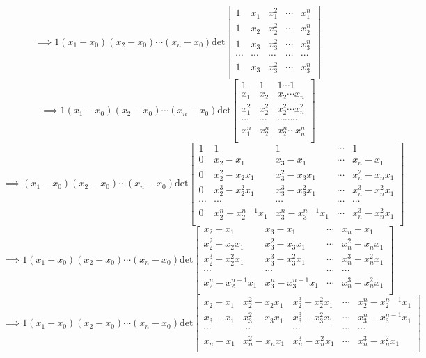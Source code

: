 \documentclass[letterpaper,12pt]{article}
\theoremstyle{definition}
\begin{document}
\[
\implies
1(x_1-x_0)(x_2-x_0)\cdots(x_n - x_0)\text{det}
\begin{bmatrix}
    1 & x_1 & x_1^2 & \cdots & x_1^n \\
    1 & x_2 & x_2^2 & \cdots & x_2^n \\
    1 & x_3 & x_3^2 & \cdots & x_3^n \\
    \cdots &\cdots &\cdots &\cdots &\cdots \\
    1 & x_3 & x_3^2 & \cdots & x_3^n \\
\end{bmatrix}
\]
\[
\implies
1(x_1-x_0)(x_2-x_0)\cdots(x_n - x_0)\text{det}
\begin{bmatrix}
    1 & 1 & 1 \cdots 1 \\ 
    x_1 & x_2 & x_2 \cdots x_n \\ 
    x_1^2 & x_2^2 & x_2^2 \cdots x_n^2 \\ 
    \cdots & \cdots & \cdots \cdots \cdots \\ 
    x_1^n & x_2^n & x_2^n \cdots x_n^n \\ 
\end{bmatrix} 
\]
\[
\implies
(x_1-x_0)(x_2-x_0)\cdots(x_n - x_0)\text{det}
\begin{bmatrix}
    1 & 1 & 1 &\cdots& 1 \\ 
    0 & x_2 - x_1 & x_3 - x_1 &\cdots& x_n - x_1 \\ 
    0 & x_2^2 - x_2x_1 & x_3^2 - x_3x_1 &\cdots &x_n^2 - x_nx_1  \\ 
    0 & x_2^3 - x_2^2x_1 & x_3^3 - x_3^2x_1 &\cdots &x_n^3 - x_n^2x_1  \\ 
    \cdots & \cdots & \cdots& \cdots &\cdots \\ 
    0 & x_2^n - x_2^{n-1}x_1 & x_3^n - x_3^{n-1}x_1&\cdots& x_n^3 - x_n^2x_1  \\ 
\end{bmatrix} 
\]
\[
\implies
1(x_1-x_0)(x_2-x_0)\cdots(x_n - x_0)\text{det}
\begin{bmatrix}
x_2 - x_1 & x_3 - x_1 &\cdots& x_n - x_1 \\ 
x_2^2 - x_2x_1 & x_3^2 - x_3x_1 &\cdots &x_n^2 - x_nx_1  \\ 
x_2^3 - x_2^2x_1 & x_3^3 - x_3^2x_1 &\cdots &x_n^3 - x_n^2x_1  \\ 
\cdots & \cdots& \cdots &\cdots \\ 
x_2^n - x_2^{n-1}x_1 & x_3^n - x_3^{n-1}x_1&\cdots& x_n^3 - x_n^2x_1  \\ 
\end{bmatrix} 
\]
\[
\implies
1(x_1-x_0)(x_2-x_0)\cdots(x_n - x_0)\text{det}
\begin{bmatrix}
    x_2 - x_1 & x_2^2 - x_2x_1 &x_2^3 - x_2^2x_1 &\cdots &x_2^n - x_2^{n-1}x_1\\
    x_3 - x_1 &x_3^2 - x_3x_1 &x_3^3 - x_3^2x_1 &\cdots & x_3^n - x_3^{n-1}x_1\\
    \cdots&\cdots&\cdots &\cdots &\cdots\\
    x_n - x_1 &x_n^2 - x_nx_1& x_n^3 - x_n^2x_1 &\cdots & x_n^3 - x_n^2x_1 \\ 
\end{bmatrix}
\]
\end{document}
